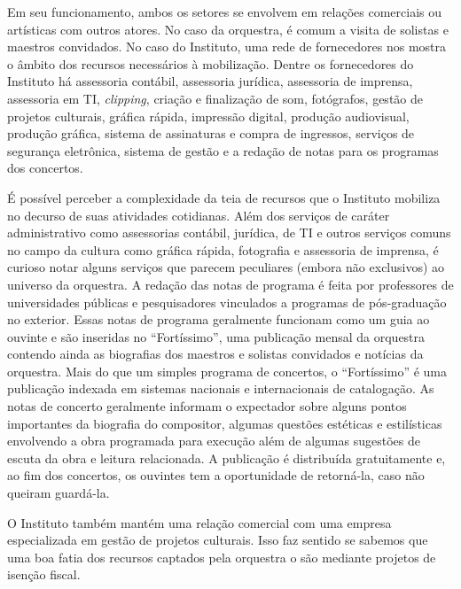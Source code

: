 \documentclass[a4paper, 12pt, openright, oneside, german, french, english, brazil]{abntex2}
\begin{document}
	Em seu funcionamento, ambos os setores se envolvem em relações comerciais ou artísticas com outros atores. No caso da orquestra, é comum a visita de solistas e maestros convidados. No caso do Instituto, uma rede de fornecedores nos mostra o âmbito dos recursos necessários à mobilização. Dentre os fornecedores do Instituto há assessoria contábil, assessoria jurídica, assessoria de imprensa, assessoria em TI, \textit{clipping}, criação e finalização de som, fotógrafos, gestão de projetos culturais, gráfica rápida, impressão digital, produção audiovisual, produção gráfica, sistema de assinaturas e compra de ingressos, serviços de segurança eletrônica, sistema de gestão e a redação de notas para os programas dos concertos. 
	
	
	É possível perceber a complexidade da teia de recursos que o Instituto mobiliza no decurso de suas atividades cotidianas. Além dos serviços de caráter administrativo como assessorias contábil, jurídica, de TI e outros serviços comuns no campo da cultura como gráfica rápida, fotografia e assessoria de imprensa, é curioso notar alguns serviços que parecem peculiares (embora não exclusivos) ao universo da orquestra. A redação das notas de programa é feita por professores de universidades públicas e pesquisadores vinculados a programas de pós-graduação no exterior. Essas notas de programa geralmente funcionam como um guia ao ouvinte e são inseridas no ``Fortíssimo'', uma publicação mensal da orquestra contendo ainda as biografias dos maestros e solistas convidados e notícias da orquestra. Mais do que um simples programa de concertos, o ``Fortíssimo'' é uma publicação indexada em sistemas nacionais e internacionais de catalogação. As notas de concerto geralmente informam o expectador sobre alguns pontos importantes da biografia do compositor, algumas questões estéticas e estilísticas envolvendo a obra programada para execução além de algumas sugestões de escuta da obra e leitura relacionada. A publicação é distribuída gratuitamente e, ao fim dos concertos, os ouvintes tem a oportunidade de retorná-la, caso não queiram guardá-la.
	
	O Instituto também mantém uma relação comercial com uma empresa especializada em gestão de projetos culturais. Isso faz sentido se sabemos que uma boa fatia dos recursos captados pela orquestra o são mediante projetos de isenção fiscal.
	
\end{document}
